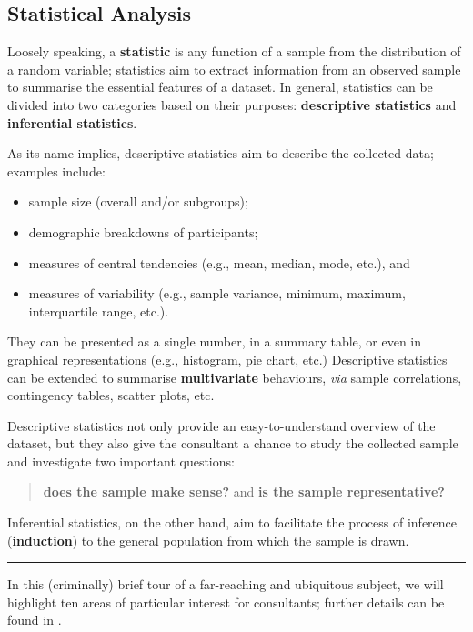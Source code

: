 \subsection{Statistical Analysis}
\label{sec:SA}


Loosely speaking, a \textbf{statistic} is any function of a sample from the distribution of a random variable; statistics aim to extract information from an observed sample to summarise the essential features of a dataset.
\newl In general, statistics can be divided into two categories based on their purposes: \textbf{descriptive statistics} and \textbf{inferential statistics}. \par As its name implies, descriptive statistics aim to describe the collected data; examples include:
\begin{itemize}[noitemsep]
\item sample size (overall and/or subgroups);
\item demographic breakdowns of participants;
\item measures of central tendencies (e.g., mean, median, mode, etc.), and 
\item measures of variability (e.g., sample variance, minimum, maximum, interquartile range, etc.).\end{itemize}
They can be presented as a single number, in a summary table, or even in graphical representations (e.g., histogram, pie chart, etc.) Descriptive statistics can be extended to summarise \textbf{multivariate} behaviours, \textit{via} sample correlations, contingency tables, scatter plots, etc. \par 
Descriptive statistics not only provide an easy-to-understand overview of the dataset, but they also give the consultant a chance to study the collected sample and investigate two important questions: \begin{quote}\textbf{does the sample make sense?} and \textbf{is the sample representative?}
\end{quote}
Inferential statistics, on the other hand, aim to facilitate the process of inference (\textbf{induction}) to the general population from which the sample is drawn.\begin{center}
    \rule{0.5\textwidth}{.4pt}
\end{center}
In this (criminally) brief tour of a far-reaching and ubiquitous subject, we will highlight ten areas of particular interest for consultants; further details can be found in \cite{SA_SA,SA_KNNL,SA_HW,SA_BB,SA_SS,SA_R,SA_Re}.  

